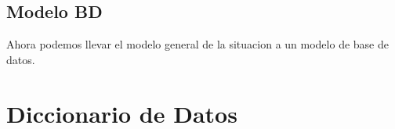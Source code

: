 \documentclass{article}
\begin{document}
\subsection{Modelo BD}
Ahora podemos llevar el modelo general de la situacion a un modelo de base de datos.

\begin{center}
\end{center}

\section{Diccionario de Datos}
\end{document}
